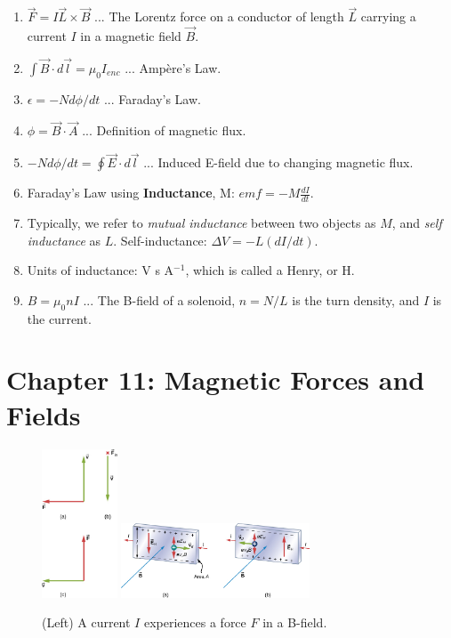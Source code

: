 \documentclass[10pt]{article}
\begin{document}
\begin{enumerate}
\item $\vec{F} = I\vec{L} \times \vec{B}$ ... The Lorentz force on a conductor of length $\vec{L}$ carrying a current $I$ in a magnetic field $\vec{B}$.
\item $\int \vec{B} \cdot d\vec{l} = \mu_0 I_{enc}$ ... Amp\`{e}re's Law.
\item $\epsilon = -N d\phi/dt$ ... Faraday's Law.
\item $\phi = \vec{B} \cdot \vec{A}$ ... Definition of magnetic flux.
\item $-N d\phi/dt = \oint \vec{E} \cdot d\vec{l}$ ... Induced E-field due to changing magnetic flux.
\item Faraday's Law using \textbf{Inductance}, M: $emf = -M \frac{dI}{dt}$.
\item Typically, we refer to \textit{mutual inductance} between two objects as $M$, and \textit{self inductance} as $L$.  Self-inductance: $\Delta V = -L (dI/dt)$.
\item Units of inductance: V s A$^{-1}$, which is called a Henry, or H.
\item $B = \mu_0 n I$ ... The B-field of a solenoid, $n = N/L$ is the turn density, and $I$ is the current.
\end{enumerate}

\clearpage

\section{Chapter 11: Magnetic Forces and Fields}

\begin{figure}
\centering
\includegraphics[width=0.2\textwidth]{bfield1.jpeg} \hspace{0.5cm}
\includegraphics[width=0.5\textwidth]{hallEffect1.jpeg}
\caption{\label{fig:chap11_1} (Left) A current $I$ experiences a force $F$ in a B-field.}
\end{figure}
\end{document}
